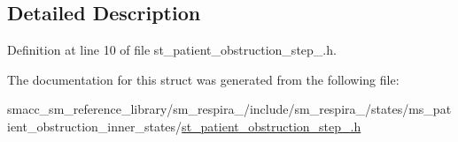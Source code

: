 \subsection{Detailed Description}


Definition at line 10 of file st\+\_\+patient\+\_\+obstruction\+\_\+step\+\_.\+h.



The documentation for this struct was generated from the following file\+:\begin{DoxyCompactItemize}
\item 
smacc\+\_\+sm\+\_\+reference\+\_\+library/sm\+\_\+respira\+\_/include/sm\+\_\+respira\+\_/states/ms\+\_\+patient\+\_\+obstruction\+\_\+inner\+\_\+states/\hyperlink{st__patient__obstruction__step__1_8h}{st\+\_\+patient\+\_\+obstruction\+\_\+step\+\_.\+h}\end{DoxyCompactItemize}
